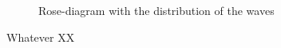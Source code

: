 \begin{figure}[H]
\center
{}
\caption{Rose-diagram with the distribution of the waves}
\end{figure}

Whatever XX
